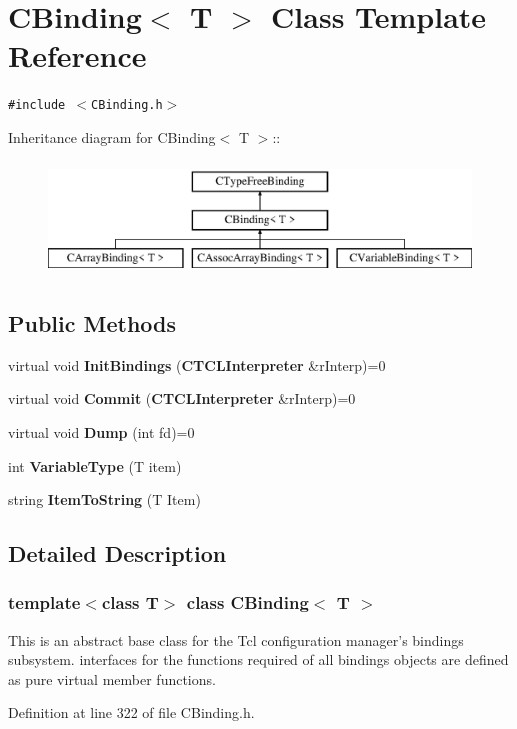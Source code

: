\section{CBinding$<$ T $>$  Class Template Reference}
\label{classCBinding}
{\tt \#include $<$CBinding.h$>$}

Inheritance diagram for CBinding$<$ T $>$::\begin{figure}[H]
\begin{center}
\leavevmode
\includegraphics[height=3cm]{classCBinding}
\end{center}
\end{figure}
\subsection*{Public Methods}
\begin{CompactItemize}
\item 
virtual void {\bf Init\-Bindings} ({\bf CTCLInterpreter} \&r\-Interp)=0
\item 
virtual void {\bf Commit} ({\bf CTCLInterpreter} \&r\-Interp)=0
\item 
virtual void {\bf Dump} (int fd)=0
\item 
int {\bf Variable\-Type} (T item)
\item 
string {\bf Item\-To\-String} (T Item)
\end{CompactItemize}


\subsection{Detailed Description}
\subsubsection*{template$<$class T$>$ class CBinding$<$ T $>$}

This is an abstract base class for the Tcl configuration manager's bindings subsystem. interfaces for the functions required of all bindings objects are defined as pure virtual member functions. 



Definition at line 322 of file CBinding.h.

